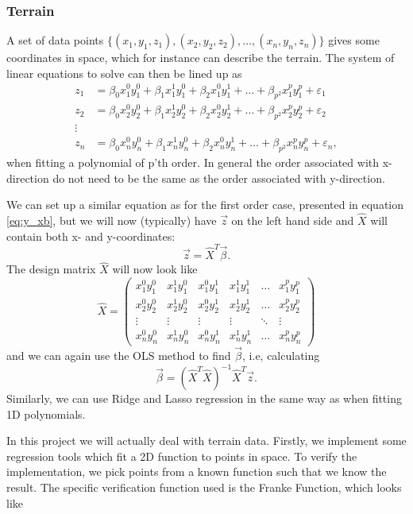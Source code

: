 \subsubsection{Terrain} \label{sec:terrain}
A set of data points $\{(x_1, y_1, z_1), (x_2, y_2, z_2),\hdots, (x_n, y_n,z_n)\}$ gives some coordinates in space, which for instance can describe the terrain. The system of linear equations to solve can then be lined up as 
\begin{align*}
z_1&=\beta_0x_1^0y_1^0+\beta_1x_1^1y_1^0+\beta_2x_1^0y_1^1+\hdots+\beta_{p^2}x_1^py_1^p+\varepsilon_1\\
z_2&=\beta_0x_2^0y_2^0+\beta_1x_2^1y_2^0+\beta_2x_2^0y_2^1+\hdots+\beta_{p^2}x_2^py_2^p+\varepsilon_2\\
\vdots\\
z_n&=\beta_0x_n^0y_n^0+\beta_1x_n^1y_n^0+\beta_2x_n^0y_n^1+\hdots+\beta_{p^2}x_n^py_n^p+\varepsilon_n,
\end{align*}
when fitting a polynomial of p'th order. In general the order associated with x-direction do not need to be the same as the order associated with y-direction. 

We can set up a similar equation as for the first order case, presented in equation \eqref{eq:y_xb}, but we will now (typically) have $\vec{z}$ on the left hand side and $\hat{X}$ will contain both x- and y-coordinates:
\begin{equation}
\vec{z}=\hat{X}^T\vec{\beta}.
\end{equation}
The design matrix $\hat{X}$ will now look like
\begin{equation}
\hat{X}=
\begin{pmatrix}
x_1^0y_1^0&x_1^1y_1^0&x_1^0y_1^1&x_1^1y_1^1&\hdots&x_1^py_1^p\\
x_2^0y_2^0&x_2^1y_2^0&x_2^0y_2^1&x_2^1y_2^1&\hdots&x_2^py_2^p\\
\vdots&\vdots&\vdots&\vdots&\ddots&\vdots\\
x_n^0y_n^0&x_n^1y_n^0&x_n^0y_n^1&x_n^1y_n^1&\hdots&x_n^py_n^p
\end{pmatrix}
\end{equation}
and we can again use the OLS method to find $\vec{\beta}$, i.e, calculating
\begin{equation}
\vec{\beta}=(\hat{X}^T\hat{X})^{-1}\hat{X}^T\vec{z}.
\end{equation}
Similarly, we can use Ridge and Lasso regression in the same way as when fitting 1D polynomials. 

In this project we will actually deal with terrain data. Firstly, we implement some regression tools which fit a 2D function to points in space. To verify the implementation, we pick points from a known function such that we know the result. The specific verification function used is the Franke Function, which looks like

